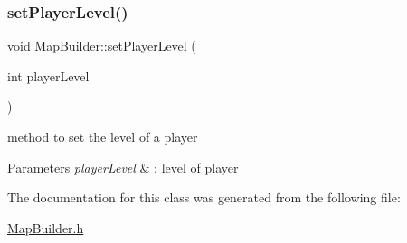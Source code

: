 \subsubsection{\texorpdfstring{set\+Player\+Level()}{setPlayerLevel()}}
{\footnotesize\ttfamily void Map\+Builder\+::set\+Player\+Level (\begin{DoxyParamCaption}\item[{int}]{player\+Level }\end{DoxyParamCaption})\hspace{0.3cm}{\ttfamily [inline]}}

method to set the level of a player 
\begin{DoxyParams}{Parameters}
{\em player\+Level} & \+: level of player \\
\hline
\end{DoxyParams}


The documentation for this class was generated from the following file\+:\begin{DoxyCompactItemize}
\item 
\hyperlink{_map_builder_8h}{Map\+Builder.\+h}\end{DoxyCompactItemize}
